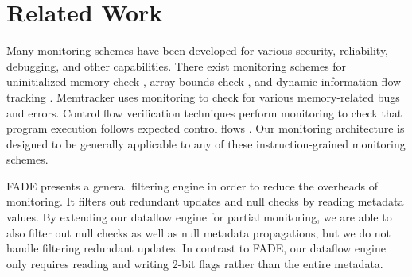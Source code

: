 \section{Related Work}
\label{sec:related}

Many monitoring schemes have been developed for various security, reliability,
debugging, and other capabilities. There exist monitoring schemes for uninitialized
memory check \cite{mondrian-asplos02}, array bounds check
\cite{hardbound-asplos08, clause-ase07}, and dynamic information flow
tracking \cite{dift-asplos04, raksha-isca07, loki-osdi08}.
Memtracker \cite{memtracker-hpca07} uses monitoring to check for various
memory-related bugs and errors.  Control flow verification techniques perform
monitoring to check that program execution follows expected control flows
\cite{schuette-comp87, impres-dac06,
kayaalp-isca12}.  Our monitoring architecture is designed to
be generally applicable to any of these instruction-grained monitoring schemes.
 
FADE \cite{fade-hpca14} presents a general filtering engine in order to reduce
the overheads of monitoring. It filters out redundant updates and null checks
by reading metadata values. 
By extending our dataflow engine for partial monitoring, we are able to also
filter out null checks as well as null metadata propagations, but we do not
handle filtering redundant updates.
In contrast to FADE, our dataflow engine only
requires reading and writing 2-bit flags rather than the entire metadata. 

